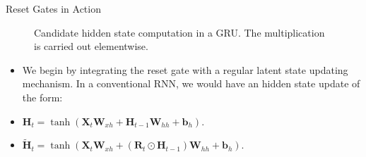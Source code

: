 \begin{vbframe}{Reset Gates in Action}
     \begin{figure}
      \centering
      \caption{\footnotesize{Candidate hidden state computation in a GRU. The multiplication is carried out elementwise.}}
  \end{figure}
  \begin{itemize}
   \item We begin by integrating the reset gate with a regular latent state updating mechanism. In a conventional RNN, we would have an hidden state update of the form: 
   \item $\mathbf{H}_t = \tanh(\mathbf{X}_t \mathbf{W}_{xh} + \mathbf{H}_{t-1}\mathbf{W}_{hh} + \mathbf{b}_h).$
  \item  $\tilde{\mathbf{H}}_t = \tanh(\mathbf{X}_t \mathbf{W}_{xh} + \left(\mathbf{R}_t \odot \mathbf{H}_{t-1}\right) \mathbf{W}_{hh} + \mathbf{b}_h).$
  \end{itemize}
 
\end{vbframe}
